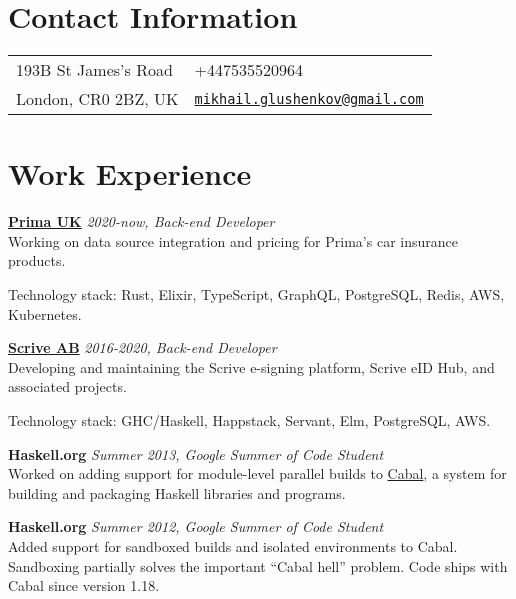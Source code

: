 \documentclass[margin,line]{res}
\begin{document}

\begin{resume}
    \section{\sc Contact Information}
    \vspace{.05in}
    \begin{tabular}{@{}p{2in}p{4in}}
        193B St James's Road &
        +447535520964                           \\
        London, CR0 2BZ, UK  &
        \href{mailto:mikhail.glushenkov@gmail.com}
        {\texttt{mikhail.glushenkov@gmail.com}} \\
    \end{tabular}

    \section{\sc Work Experience}

     {\bf \href{http://helloprima.co.uk}{Prima UK}} \hfill {\it 2020-now, Back-end Developer}\\
    Working on data source integration and pricing for Prima's car insurance products.

    Technology stack: Rust, Elixir, TypeScript, GraphQL, PostgreSQL, Redis, AWS, Kubernetes.

        {\bf \href{http://scrive.com}{Scrive AB}} \hfill {\it 2016-2020, Back-end Developer}\\
    Developing and maintaining the Scrive e-signing platform, Scrive eID
    Hub, and associated projects.

    Technology stack: GHC/Haskell, Happstack, Servant, Elm, PostgreSQL, AWS.

        {\bf Haskell.org} \hfill {\it Summer 2013, Google Summer of Code Student}\\
    Worked on adding support for module-level parallel builds to
    \href{http://haskell.org/cabal}{Cabal}, a system for building and
    packaging Haskell libraries and programs.

        {\bf Haskell.org} \hfill {\it Summer 2012, Google Summer of Code Student}\\
    Added support for sandboxed builds and isolated environments to
    Cabal. Sandboxing partially solves the important ``Cabal hell'' problem. Code
    ships with Cabal since version 1.18.


\end{resume}
\end{document}
